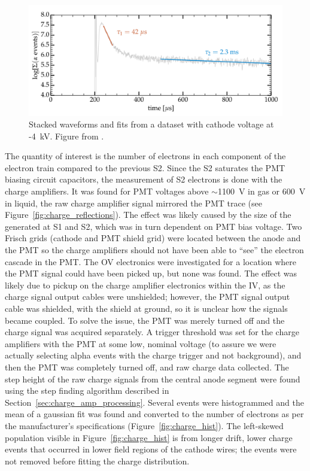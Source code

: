 \begin{figure}[htbp]
\begin{center}
\includegraphics[width=\textwidth]{figures/etrains/etrain_stack.png}
\caption{Stacked waveforms and fits from a dataset with cathode voltage at -4~kV. Figure from \cite{SorensenKamdin2018}. }
\label{fig:etrain_stack}
\end{center}
\end{figure}

The quantity of interest is the number of electrons in each component of the electron train compared to the previous S2. Since the S2 saturates the \ac{PMT} biasing circuit capacitors, the measurement of S2 electrons is done with the charge amplifiers. It was found for \ac{PMT} voltages above $\sim$1100~V in gas or 600~V in liquid, the raw charge amplifier signal mirrored the \ac{PMT} trace (see Figure~\ref{fig:charge_reflections}). The effect was likely caused by the size of the generated at S1 and S2, which was in turn dependent on \ac{PMT} bias voltage. Two Frisch grids (cathode and \ac{PMT} shield grid) were located between the anode and the \ac{PMT} so the charge amplifiers should not have been able to ``see'' the electron cascade in the \ac{PMT}. The \ac{OV} electronics were investigated for a location where the \ac{PMT} signal could have been picked up, but none was found. The effect was likely due to pickup on the charge amplifier electronics within the \ac{IV}, as the charge signal output cables were unshielded; however, the \ac{PMT} signal output cable was shielded, with the shield at ground, so it is unclear how the signals became coupled. To solve the issue, the \ac{PMT} was merely turned off and the charge signal was acquired separately. A trigger threshold was set for the charge amplifiers with the \ac{PMT} at some low, nominal voltage (to assure we were actually selecting alpha events with the charge trigger and not background), and then the \ac{PMT} was completely turned off, and raw charge data collected.  The step height of the raw charge signals from the central anode segment were found using the step finding algorithm described in Section~\ref{sec:charge_amp_processing}. Several events were histogrammed and the mean of a gaussian fit was found and converted to the number of electrons as per the manufacturer's specifications (Figure~\ref{fig:charge_hist}). The left-skewed population visible in Figure~\ref{fig:charge_hist} is from longer drift, lower charge events that occurred in lower field regions of the cathode wires; the events were not removed before fitting the charge distribution.


